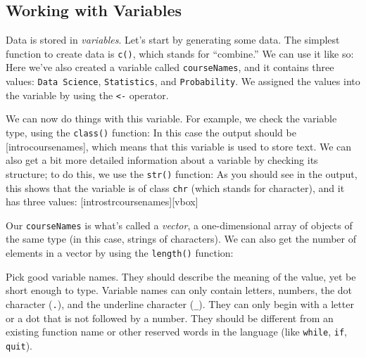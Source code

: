 \subsection{Working with Variables}
Data is stored in \textit{variables}.
Let's start by generating some data.
The simplest function to create data is  \lstinline{c()}, which stands for ``combine.'' 
We can use it like so:
Here we've also created a variable called \lstinline{courseNames}, and it contains 
three values: \lstinline{Data Science}, \lstinline{Statistics}, and \lstinline{Probability}.
We assigned the values into the variable by using the \lstinline{<-} operator. 


We can now do things with this variable. For example, we check the variable type,
using the \lstinline{class()} function:
\noindent In this case the output should be  
 [introcoursenames], which means that this variable is
 used to store text. %
We can also get a bit more detailed information about a variable by checking
its structure; to do this, we use the \lstinline{str()} function:
\noindent As you should see in the output, this shows that the variable is of class 
\lstinline{chr} (which stands for character), and it has three values:
[introstrcoursenames][vbox]


Our \lstinline{courseNames} is what's called a \emph{vector}, a one-dimensional
array of objects of the same type (in this case, strings of characters).
We can also get the number of elements in a vector by using the 
\lstinline{length()} function:


Pick good variable names. They should describe the meaning of the value, yet be
short enough to type. Variable names can only contain letters, numbers, the dot
character (\lstinline{.}), and the underline character (\lstinline{_}). They can only
begin with a letter or a dot that is not followed by a number. They should
be different from an existing function name or other reserved words in the language
(like \lstinline{while}, \lstinline{if}, \lstinline{quit}).


